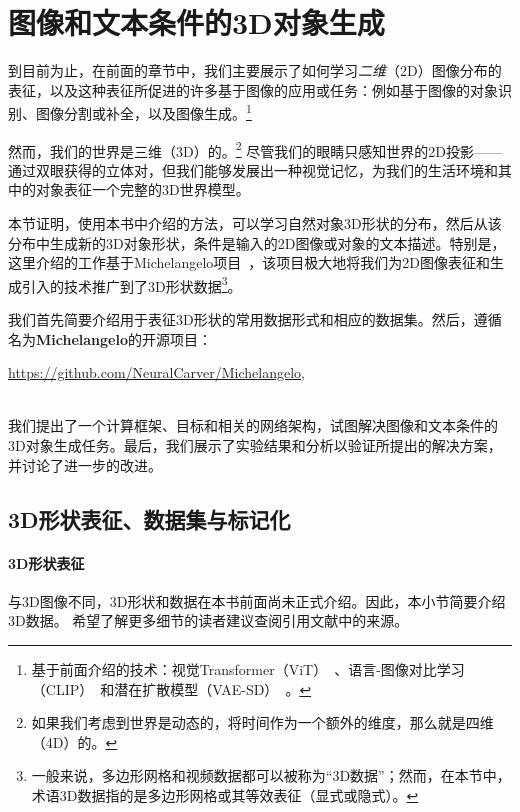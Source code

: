 \documentclass[../../book-main_zh.tex]{subfiles}
\begin{document}
\section{图像和文本条件的3D对象生成}
\label{sec:Michelangelo}\label{sec:object-generation}

到目前为止，在前面的章节中，我们主要展示了如何学习{\em 二维}（2D）图像分布的表征，以及这种表征所促进的许多基于图像的应用或任务：例如基于图像的对象识别、图像分割或补全，以及图像生成。\footnote{基于前面介绍的技术：视觉Transformer（ViT）~\cite{NIPS2017_3f5ee243}、语言-图像对比学习（CLIP）~\cite{pmlr-v139-radford21a}和潜在扩散模型（VAE-SD）~\cite{rombach2022high}。}

然而，我们的世界是三维（3D）的。\footnote{如果我们考虑到世界是动态的，将时间作为一个额外的维度，那么就是四维（4D）的。} 尽管我们的眼睛只感知世界的2D投影——通过双眼获得的立体对，但我们能够发展出一种视觉记忆，为我们的生活环境和其中的对象表征一个完整的3D世界模型。

本节证明，使用本书中介绍的方法，可以学习自然对象3D形状的分布，然后从该分布中生成新的3D对象形状，条件是输入的2D图像或对象的文本描述。特别是，这里介绍的工作基于Michelangelo项目~\cite{NEURIPS2023_ea1a7f7b}，该项目极大地将我们为2D图像表征和生成引入的技术推广到了3D形状数据\footnote{一般来说，多边形网格和视频数据都可以被称为“3D数据”；然而，在本节中，术语3D数据指的是多边形网格或其等效表征（显式或隐式）。}。

我们首先简要介绍用于表征3D形状的常用数据形式和相应的数据集。然后，遵循名为\textbf{Michelangelo}的开源项目\cite{NEURIPS2023_ea1a7f7b}：\\
\centerline{\url{https://github.com/NeuralCarver/Michelangelo},}\\
我们提出了一个计算框架、目标和相关的网络架构，试图解决图像和文本条件的3D对象生成任务。最后，我们展示了实验结果和分析以验证所提出的解决方案，并讨论了进一步的改进。

\subsection{3D形状表征、数据集与标记化}

\paragraph{3D形状表征}
\label{sec:3D representation}
与3D图像不同，3D形状和数据在本书前面尚未正式介绍。因此，本小节简要介绍3D数据。
希望了解更多细节的读者建议查阅引用文献中的来源。
\end{document}
